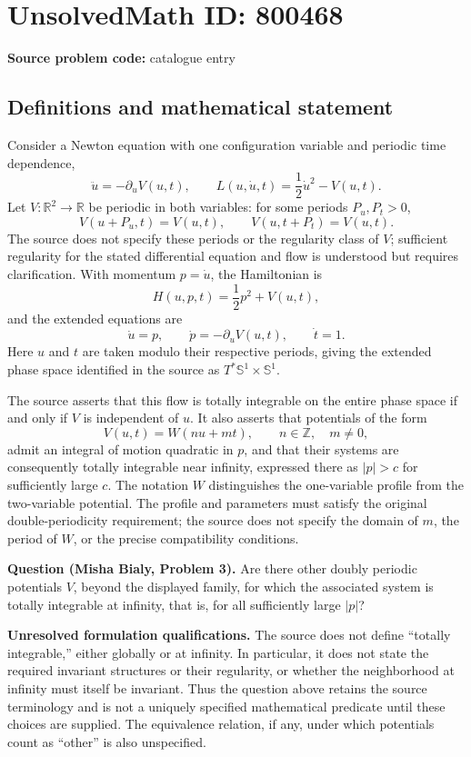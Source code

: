 \documentclass[11pt]{article}
\newcommand{\Z}{\mathbb{Z}}
\newcommand{\R}{\mathbb{R}}
\begin{document}
\section*{UnsolvedMath ID: 800468}
\textbf{Source problem code:} catalogue entry
\subsection{Definitions and mathematical statement}
Consider a Newton equation with one configuration variable and periodic time dependence,
\[
\ddot u=-\partial_u V(u,t),\qquad L(u,\dot u,t)=\frac12\dot u^2-V(u,t).
\]
Let \(V:\R^2\to\R\) be periodic in both variables: for some periods \(P_u,P_t>0\),
\[
V(u+P_u,t)=V(u,t),\qquad V(u,t+P_t)=V(u,t).
\]
The source does not specify these periods or the regularity class of \(V\); sufficient regularity for the stated differential equation and flow is understood but requires clarification. With momentum \(p=\dot u\), the Hamiltonian is
\[
H(u,p,t)=\frac12p^2+V(u,t),
\]
and the extended equations are
\[
\dot u=p,\qquad \dot p=-\partial_uV(u,t),\qquad \dot t=1.
\]
Here \(u\) and \(t\) are taken modulo their respective periods, giving the extended phase space identified in the source as \(T^*\mathbb S^1\times\mathbb S^1\).

The source asserts that this flow is totally integrable on the entire phase space if and only if \(V\) is independent of \(u\). It also asserts that potentials of the form
\[
V(u,t)=W(nu+mt),\qquad n\in\Z,\quad m\ne0,
\]
admit an integral of motion quadratic in \(p\), and that their systems are consequently totally integrable near infinity, expressed there as \(|p|>c\) for sufficiently large \(c\). The notation \(W\) distinguishes the one-variable profile from the two-variable potential. The profile and parameters must satisfy the original double-periodicity requirement; the source does not specify the domain of \(m\), the period of \(W\), or the precise compatibility conditions.

\textbf{Question (Misha Bialy, Problem 3).} Are there other doubly periodic potentials \(V\), beyond the displayed family, for which the associated system is totally integrable at infinity, that is, for all sufficiently large \(|p|\)?

\textbf{Unresolved formulation qualifications.} The source does not define ``totally integrable,'' either globally or at infinity. In particular, it does not state the required invariant structures or their regularity, or whether the neighborhood at infinity must itself be invariant. Thus the question above retains the source terminology and is not a uniquely specified mathematical predicate until these choices are supplied. The equivalence relation, if any, under which potentials count as ``other'' is also unspecified.
\end{document}
